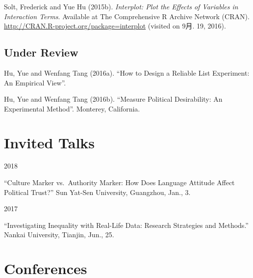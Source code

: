 \documentclass[10.5pt,]{article}
\providecommand{\tightlist}{%
	\setlength{\itemsep}{0pt}\setlength{\parskip}{0pt}}
\renewenvironment{itemize}{
	\begin{list}{}{
			\setlength{\leftmargin}{1.5em}
		}
	}{
	\end{list}
}
\begin{document}
Solt, Frederick and Yue Hu (2015b).
\emph{Interplot: Plot the Effects of Variables in Interaction Terms}.
Available at The Comprehensive R Archive Network (CRAN).
\url{http://CRAN.R-project.org/package=interplot} (visited on 9月. 19,
2016).

\vspace{\baselineskip}

\hypertarget{under-review}{%
\subsection{Under Review}\label{under-review}}

Hu, Yue and Wenfang Tang (2016a). ``How to Design a Reliable List
Experiment: An Empirical View''.

Hu, Yue and Wenfang Tang (2016b). ``Measure Political Desirability: An
Experimental Method''. Monterey, California.

\hypertarget{invited-talks}{%
\section{Invited Talks}\label{invited-talks}}

\begin{itemize}
\tightlist
\item
  2018

  \begin{itemize}
  \tightlist
  \item
    ``Culture Marker vs.~Authority Marker: How Does Language Attitude
    Affect Political Trust?'' Sun Yat-Sen University, Guangzhou, Jan.,
    3.
  \end{itemize}
\item
  2017

  \begin{itemize}
  \tightlist
  \item
    ``Investigating Inequality with Real-Life Data: Research Strategies
    and Methods.'' Nankai University, Tianjin, Jun., 25.
  \end{itemize}
\end{itemize}

\hypertarget{conferences}{%
\section{Conferences}\label{conferences}}
\end{document}

